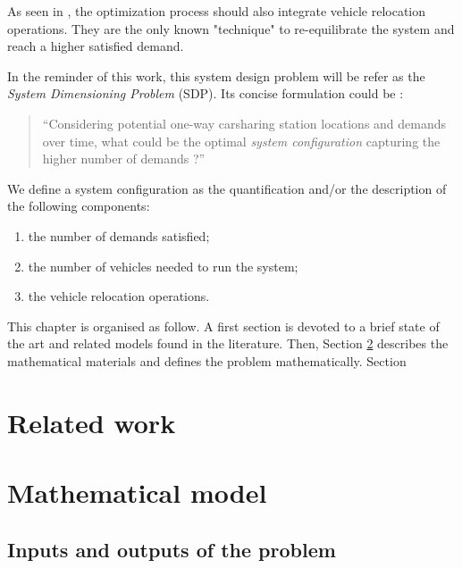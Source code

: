 \begin{bibunit}[ieeetr]
As seen in \cite{les_relocs_sont_importantes_et_necessaires}, the optimization process should also integrate vehicle relocation operations.
They are the only known "technique" to re-equilibrate the system and reach a higher satisfied demand.

In the reminder of this work, this system design problem will be refer as the \emph{System Dimensioning Problem} (SDP).
Its concise formulation could be :
\begin{quote}
``Considering potential one-way carsharing station locations and demands over time, what could be the optimal \emph{system configuration} capturing the higher number of demands ?''
\end{quote}

We define a system configuration as the quantification and/or the description of the following components:
\begin{enumerate}
\item the number of demands satisfied;
\item the number of vehicles needed to run the system;
\item the vehicle relocation operations.
\end{enumerate}

This chapter is organised as follow.
A first section is devoted to a brief state of the art and related models found in the literature.
Then, Section \ref{sec:mathModel} describes the mathematical materials and defines the problem mathematically.
Section 


\newpage
\section{Related work}


\newpage
\section{Mathematical model} \label{sec:mathModel}
\subsection{Inputs and outputs of the problem}


\end{bibunit}
